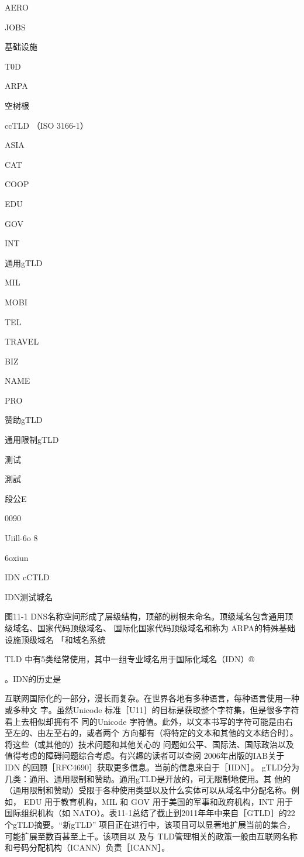 AERO

JOBS

基础设施

T0D

ARPA

空树根

ccTLD （ISO 3166-1）

ASIA

CAT

COOP

EDU

GOV

INT

通用gTLD

MIL

MOBI

TEL

TRAVEL

BIZ

NAME

PRO

赞助gTLD

通用限制gTLD

测试

測試

段公E

0090

Uiill-6o 8

6oxiun

IDN cCTLD

IDN测试城名

图11-1
DNS名称空间形成了层级结构，顶部的树根未命名。顶级域名包含通用顶级域名、国家代码顶级域名、
国际化国家代码顶级域名和称为 ARPA的特殊基础设施顶级域名
「和域名系统

TLD 中有5类经常使用，其中一组专业域名用于国际化域名（IDN）®

。IDN的历史是

互联网国际化的一部分，漫长而复杂。在世界各地有多种语言，每种语言使用一种或多种文
字。虽然Unicode 标准［U11］的目标是获取整个字符集，但是很多字符看上去相似却拥有不
同的Unicode 字符值。此外，以文本书写的字符可能是由右至左的、由左至右的，或者两个
方向都有（将特定的文本和其他的文本结合时）。将这些（或其他的）技术问题和其他关心的
问题如公平、国际法、国际政治以及值得考虑的障碍问题综合考虑。有兴趣的读者可以查阅
2006年出版的IAB关于IDN 的回顾［RFC4690］获取更多信息。当前的信息来自于［IIDN］。
gTLD分为几类：通用、通用限制和赞助。通用gTLD是开放的，可无限制地使用。其
他的（通用限制和赞助）受限于各种使用类型以及什么实体可以从域名中分配名称。例如，
EDU 用于教育机构，MIL 和 GOV 用于美国的军事和政府机构，INT 用于国际组织机构（如
NATO）。表11-1总结了截止到2011年年中来自［GTLD］的22个gTLD摘要。“新gTLD”
项目正在进行中，该项目可以显著地扩展当前的集合，可能扩展至数百甚至上千。该项目以
及与 TLD管理相关的政策一般由互联网名称和号码分配机构（ICANN）负责［ICANN］。


